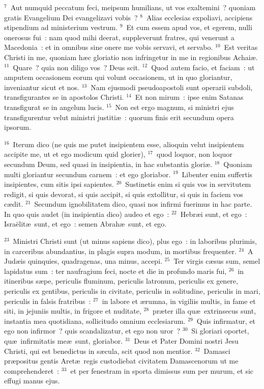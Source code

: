 ${}^{7}$~Aut numquid peccatum feci, meipsum humilians, ut vos exaltemini~? quoniam gratis Evangelium Dei evangelizavi vobis~?
${}^{8}$~Alias ecclesias expoliavi, accipiens stipendium ad ministerium vestrum.
${}^{9}$~Et cum essem apud vos, et egerem, nulli onerosus fui~: nam quod mihi deerat, suppleverunt fratres, qui venerunt a Macedonia~: et in omnibus sine onere me vobis servavi, et servabo.
${}^{10}$~Est veritas Christi in me, quoniam h\ae c gloriatio non infringetur in me in regionibus Achai\ae .
${}^{11}$~Quare~? quia non diligo vos~? Deus scit.
${}^{12}$~Quod autem facio, et faciam~: ut amputem occasionem eorum qui volunt occasionem, ut in quo gloriantur, inveniantur sicut et nos.
${}^{13}$~Nam ejusmodi pseudoapostoli sunt operarii subdoli, transfigurantes se in apostolos Christi.
${}^{14}$~Et non mirum~: ipse enim Satanas transfigurat se in angelum lucis.
${}^{15}$~Non est ergo magnum, si ministri ejus transfigurentur velut ministri justiti\ae~: quorum finis erit secundum opera ipsorum.


${}^{16}$~Iterum dico (ne quis me putet insipientem esse, alioquin velut insipientem accipite me, ut et ego modicum quid glorier),
${}^{17}$~quod loquor, non loquor secundum Deum, sed quasi in insipientia, in hac substantia glori\ae .
${}^{18}$~Quoniam multi gloriantur secundum carnem~: et ego gloriabor.
${}^{19}$~Libenter enim suffertis insipientes, cum sitis ipsi sapientes.
${}^{20}$~Sustinetis enim si quis vos in servitutem redigit, si quis devorat, si quis accipit, si quis extollitur, si quis in faciem vos c\ae dit.
${}^{21}$~Secundum ignobilitatem dico, quasi nos infirmi fuerimus in hac parte. In quo quis audet (in insipientia dico) audeo et ego~:
${}^{22}$~Hebr\ae i sunt, et ego~: Isra\"elit\ae\ sunt, et ego~: semen Abrah\ae\ sunt, et ego.


${}^{23}$~Ministri Christi sunt (ut minus sapiens dico), plus ego~: in laboribus plurimis, in carceribus abundantius, in plagis supra modum, in mortibus frequenter.
${}^{24}$~A Jud\ae is quinquies, quadragenas, una minus, accepi.
${}^{25}$~Ter virgis c\ae sus sum, semel lapidatus sum~: ter naufragium feci, nocte et die in profundo maris fui,
${}^{26}$~in itineribus s\ae pe, periculis fluminum, periculis latronum, periculis ex genere, periculis ex gentibus, periculis in civitate, periculis in solitudine, periculis in mari, periculis in falsis fratribus~:
${}^{27}$~in labore et \ae rumna, in vigiliis multis, in fame et siti, in jejuniis multis, in frigore et nuditate,
${}^{28}$~pr\ae ter illa qu\ae\ extrinsecus sunt, instantia mea quotidiana, sollicitudo omnium ecclesiarum.
${}^{29}$~Quis infirmatur, et ego non infirmor~? quis scandalizatur, et ego non uror~?
${}^{30}$~Si gloriari oportet, qu\ae\ infirmitatis me\ae\ sunt, gloriabor.
${}^{31}$~Deus et Pater Domini nostri Jesu Christi, qui est benedictus in s\ae cula, scit quod non mentior.
${}^{32}$~Damasci pr\ae positus gentis Aret\ae\ regis custodiebat civitatem Damascenorum ut me comprehenderet~:
${}^{33}$~et per fenestram in sporta dimissus sum per murum, et sic effugi manus ejus.

